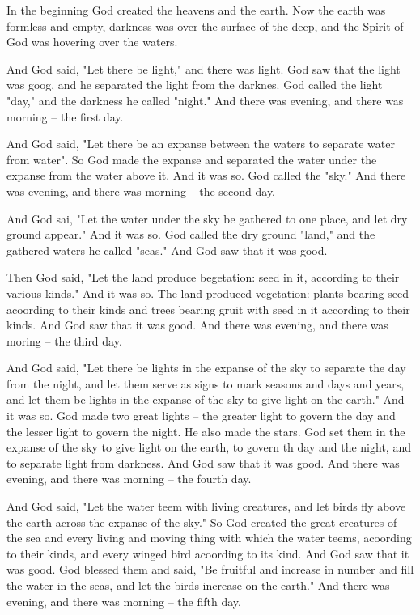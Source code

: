 \C In the beginning God created the heavens and the earth. \V Now the earth was
formless and empty, darkness was over the surface of the deep, and the Spirit of
God was hovering over the waters.

\V And God said, "Let there be light," and there was light. \V God saw that the
light was goog, and he separated the light from the darknes. \V God called the
light "day," and the darkness he called "night." And there was evening, and
there was morning -- the first day.

\V And God said, "Let there be an expanse between the waters to separate water
from water". \V So God made the expanse and separated the water under the
expanse from the water above it. And it was so. \V God called the "sky." And
there was evening, and there was morning -- the second day.

\V And God sai, "Let the water under the sky be gathered to one place, and let
dry ground appear." And it was so. \V God called the dry ground "land," and the
gathered waters he called "seas." And God saw that it was good.

\V Then God said, "Let the land produce begetation: seed in it, according to
their various kinds." And it was so. \V The land produced vegetation: plants
bearing seed acoording to their kinds and trees bearing gruit with seed in it
according to their kinds. And God saw that it was good. \V And there was
evening, and there was moring -- the third day.

\V And God said, "Let there be lights in the expanse of the sky to separate the
day from the night, and let them serve as signs to mark seasons and days and
years, \V and let them be lights in the expanse of the sky to give light on the
earth." And it was so. \V God made two great lights -- the greater light to
govern the day and the lesser light to govern the night. He also made the stars.
\V God set them in the expanse of the sky to give light on the earth, \V to
govern th day and the night, and to separate light from darkness. And God saw
that it was good. \V And there was evening, and there was morning -- the fourth
day.

\V And God said, "Let the water teem with living creatures, and let birds fly
above the earth across the expanse of the sky." \V So God created the great
creatures of the sea and every living and moving thing with which the water
teems, acoording to their kinds, and every winged bird acoording to its kind.
And God saw that it was good. \V God blessed them and said, "Be fruitful and
increase in number and fill the water in the seas, and let the birds increase on
the earth." \V And there was evening, and there was morning -- the fifth day.

